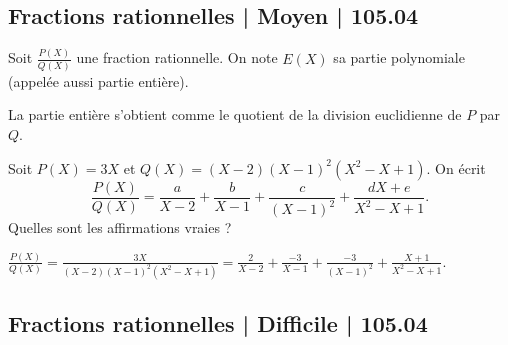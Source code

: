 \subsection{Fractions rationnelles | Moyen | 105.04}


\begin{question}
Soit $\frac{P(X)}{Q(X)}$ une fraction rationnelle. On note $E(X)$ sa partie polynomiale (appelée aussi partie entière).
\begin{answers}



\end{answers}
\begin{explanations}
La partie entière s'obtient comme le quotient de la division euclidienne de $P$ par $Q$.
\end{explanations}
\end{question}


\begin{question}
Soit $P(X)=3X$ et $Q(X) = (X-2)(X-1)^2(X^2-X+1)$.
On écrit 
$$\frac{P(X)}{Q(X)} = \frac{a}{X-2} + \frac{b}{X-1} +  \frac{c}{(X-1)^2}
+ \frac{dX+e}{X^2-X+1}.$$
Quelles sont les affirmations vraies ? 
\begin{answers}



\end{answers}
\begin{explanations}
$\frac{P(X)}{Q(X)} = \frac{3X}{(X-2)(X-1)^2(X^2-X+1)}
=\frac{2}{X-2} + \frac{-3}{X-1} +  \frac{-3}{(X-1)^2}
+ \frac{X+1}{X^2-X+1}$.
\end{explanations}
\end{question}



\subsection{Fractions rationnelles | Difficile | 105.04}



